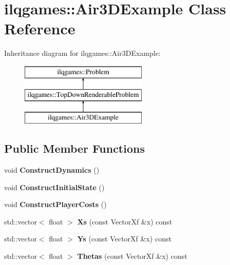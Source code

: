 \hypertarget{classilqgames_1_1_air3_d_example}{}\section{ilqgames\+:\+:Air3\+D\+Example Class Reference}
\label{classilqgames_1_1_air3_d_example}
Inheritance diagram for ilqgames\+:\+:Air3\+D\+Example\+:\begin{figure}[H]
\begin{center}
\leavevmode
\includegraphics[height=3.000000cm]{classilqgames_1_1_air3_d_example}
\end{center}
\end{figure}
\subsection*{Public Member Functions}
\begin{DoxyCompactItemize}
\item 
void {\bfseries Construct\+Dynamics} ()\hypertarget{classilqgames_1_1_air3_d_example_a4b6c015fe54e25c035c7920b99850586}{}\label{classilqgames_1_1_air3_d_example_a4b6c015fe54e25c035c7920b99850586}

\item 
void {\bfseries Construct\+Initial\+State} ()\hypertarget{classilqgames_1_1_air3_d_example_ae41104591cca4b8ca46dc744dcc2fe7c}{}\label{classilqgames_1_1_air3_d_example_ae41104591cca4b8ca46dc744dcc2fe7c}

\item 
void {\bfseries Construct\+Player\+Costs} ()\hypertarget{classilqgames_1_1_air3_d_example_a34646fa38aa8ff1e0710f942543bf635}{}\label{classilqgames_1_1_air3_d_example_a34646fa38aa8ff1e0710f942543bf635}

\item 
std\+::vector$<$ float $>$ {\bfseries Xs} (const Vector\+Xf \&x) const \hypertarget{classilqgames_1_1_air3_d_example_a8f307b95a12ab1ba7b809b6e416dd7ac}{}\label{classilqgames_1_1_air3_d_example_a8f307b95a12ab1ba7b809b6e416dd7ac}

\item 
std\+::vector$<$ float $>$ {\bfseries Ys} (const Vector\+Xf \&x) const \hypertarget{classilqgames_1_1_air3_d_example_a17e02cac87f96b968a67acc77c4fb8d4}{}\label{classilqgames_1_1_air3_d_example_a17e02cac87f96b968a67acc77c4fb8d4}

\item 
std\+::vector$<$ float $>$ {\bfseries Thetas} (const Vector\+Xf \&x) const \hypertarget{classilqgames_1_1_air3_d_example_ac528119bd527f1812a056680c6b01837}{}\label{classilqgames_1_1_air3_d_example_ac528119bd527f1812a056680c6b01837}

\end{DoxyCompactItemize}

